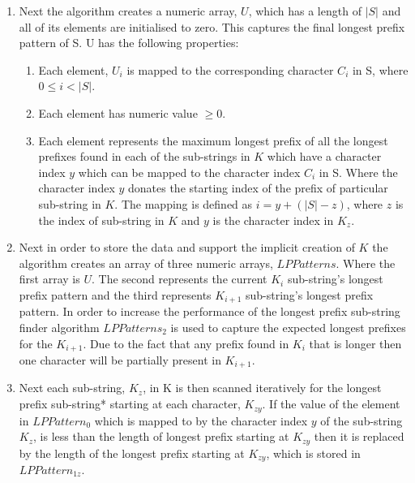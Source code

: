 \documentclass[12pt]{article}
\begin{document}
\begin{flushleft}
\begin{enumerate}
		\item Next the algorithm creates a numeric array, $U$, which has a length of $|S|$ and all of its elements are initialised to zero. This captures the final longest prefix pattern of S.  
		U has the following properties:
			\begin{enumerate}
				\item Each element, $U_{i}$ is mapped to the corresponding character $C_{i}$ in S, where $ 0 \le i < |S|$.
				\item Each element has numeric value $\ge 0$.
				\item Each element represents the maximum longest prefix of all the longest prefixes found in each of the sub-strings in $K$ which have a character index $y$ which can be mapped to the character index $C_{i}$ in S. Where the character index $y$ donates the starting index of the prefix of particular sub-string in $K$. The mapping is defined as $i = y + (|S| - z)$, where $z$ is the index of sub-string in $K$ and $y$ is the character index in $K_{z}$. 
			\end{enumerate}
		
		\item Next in order to store the data and support the implicit creation of $K$ the algorithm creates an array of three numeric arrays, $LPPatterns$. Where the first array is $U$. The second represents the current $K_{i}$ sub-string's longest prefix pattern and the third represents $K_{i + 1}$ sub-string's longest prefix pattern. In order to increase the performance of the longest prefix sub-string finder algorithm $LPPatterns_{2}$ is used to capture the expected longest prefixes for the $K_{i + 1}$. Due to the fact that any prefix found in $K_{i}$ that is longer then one character will be partially present in $K_{i + 1}$.
		
		\item Next each sub-string, $K_{z}$, in K is then scanned iteratively for the longest prefix sub-string* starting at each character, $K_{zy}$. If the value of the element in $LPPattern_{0}$ which is mapped to by the character index $y$ of the sub-string $K_{z}$, is less than the length of longest prefix starting at $K_{zy}$ then it is replaced by the length of the longest prefix starting at $K_{zy}$, which is stored in $LPPattern_{1z}$. \\
						

\end{enumerate}
\end{flushleft}
\end{document}
